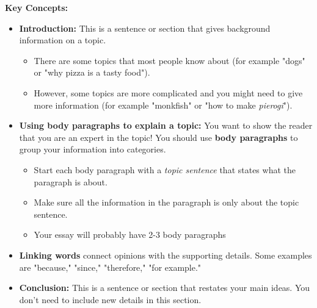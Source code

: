 \documentclass[12pt]{article}
\begin{document}
\begin{tcolorbox}[colframe=black!60, colback=white, 
coltitle=black, colbacktitle=black!15, fonttitle=\bfseries\Large, 
title=Key Concepts and Vocabulary, halign title=center, left=10pt, right=10pt, top=10pt, bottom=15pt]
\textbf{Key Concepts:}
\begin{itemize}
    \item \textbf{Introduction:} This is a sentence or section that gives background information on a topic. 
    \begin{itemize}
        \item There are some topics that most people know about (for example "dogs" or "why pizza is a tasty food").   
        \item However, some topics are more complicated and you might need to give more information (for example "monkfish" or "how to make \textit{pierogi}").

    \end{itemize}

    \item \textbf{Using body paragraphs to explain a topic:} You want to show the reader that you are an expert in the topic! You should use \textbf{body paragraphs} to group your information into categories.
    \begin{itemize}
        \item Start each body paragraph with a \textit{topic sentence} that states what the paragraph is about.
        \item Make sure all the information in the paragraph is only about the topic sentence.
        \item Your essay will probably have 2-3 body paragraphs
    \end{itemize}
    \item \textbf{Linking words} connect opinions with the supporting details. Some examples are "because," "since," "therefore," "for example."
    \item \textbf{Conclusion:} This is a sentence or section that restates your main ideas. You don't need to include new details in this section.
    \end{itemize}






\end{tcolorbox}

\vspace{1em}
\end{document}
